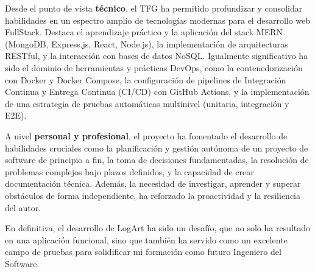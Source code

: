 Desde el punto de vista \textbf{técnico}, el TFG ha permitido profundizar y consolidar habilidades en un espectro amplio de tecnologías modernas para el desarrollo web FullStack. Destaca el aprendizaje práctico y la aplicación del stack MERN (MongoDB, Express.js, React, Node.js), la implementación de arquitecturas RESTful, y la interacción con bases de datos NoSQL. Igualmente significativo ha sido el dominio de herramientas y prácticas DevOps, como la contenedorización con Docker y Docker Compose, la configuración de pipelines de Integración Continua y Entrega Continua (CI/CD) con GitHub Actions, y la implementación de una estrategia de pruebas automáticas multinivel (unitaria, integración y E2E).

A nivel \textbf{personal y profesional}, el proyecto ha fomentado el desarrollo de habilidades cruciales como la planificación y gestión autónoma de un proyecto de software de principio a fin, la toma de decisiones fundamentadas, la resolución de problemas complejos bajo plazos definidos, y la capacidad de crear documentación técnica. Además, la necesidad de investigar, aprender y superar obstáculos de forma independiente, ha reforzado la proactividad y la resiliencia del autor.

En definitiva, el desarrollo de LogArt ha sido un desafío, que no solo ha resultado en una aplicación funcional, sino que también ha servido como un excelente campo de pruebas para solidificar mi formación como futuro Ingeniero del Software.